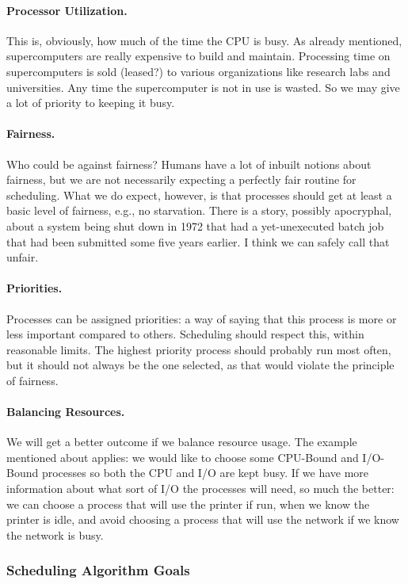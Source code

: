 \paragraph{Processor Utilization.} This is, obviously, how much of the time the CPU is busy. As already mentioned, supercomputers are really expensive to build and maintain. Processing time on supercomputers is sold (leased?) to various organizations like research labs and universities. Any time the supercomputer is not in use is wasted. So we may give a lot of priority to keeping it busy.

\paragraph{Fairness.} Who could be against fairness? Humans have a lot of inbuilt notions about fairness, but we are not necessarily expecting a perfectly fair routine for scheduling. What we do expect, however, is that processes should get at least a basic level of fairness, e.g., no starvation. There is a story, possibly apocryphal, about a system being shut down in 1972 that had a yet-unexecuted batch job that had been submitted some five years earlier. I think we can safely call that unfair.

\paragraph{Priorities.} Processes can be assigned priorities: a way of saying that this process is more or less important compared to others. Scheduling should respect this, within reasonable limits. The highest priority process should probably run most often, but it should not always be the one selected, as that would violate the principle of fairness.

\paragraph{Balancing Resources.} We will get a better outcome if we balance resource usage. The example mentioned about applies: we would like to choose some CPU-Bound and I/O-Bound processes so both the CPU and I/O are kept busy. If we have more information about what sort of I/O the processes will need, so much the better: we can choose a process that will use the printer if run, when we know the printer is idle, and avoid choosing a process that will use the network if we know the network is busy.

\subsubsection*{Scheduling Algorithm Goals}

